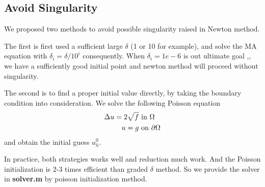 \documentclass{article}
\begin{document}
\subsection{Avoid Singularity}
We proposed two methods to avoid possible singularity raised in Newton method. 

The first is first used a sufficient large $\delta$ (1 or 10 for example), and solve the MA equation with $\delta_i = \delta/10^{i}$ consequently. When $\delta_i = 1e-6$ is out ultimate goal ,, we have a sufficiently good initial point and newton method will proceed without singularity.

The second is to find a proper initial value directly, by taking the boundary condition into consideration. We solve the following Poisson equation 
\begin{align}
\Delta u = 2\sqrt{f} & \text{ in } \Omega \\
u = g & \text{ on } \partial \Omega 
\end{align}
and obtain the initial guess $u_h^0$. 

In practice, both strategies works well and reduction much work. And the Poisson initialization is 2-3 times efficient than graded $\delta$ method. So we provide the solver in \textbf{solver.m} by poisson initialization method.
\end{document}
